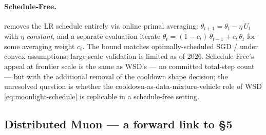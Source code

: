 \paragraph{Schedule-Free.}
\citep[Defazio et
al.\ 2024]{muon-moonlight2025} removes the LR
schedule entirely via online primal averaging:
$\theta_{t+1} = \theta_t - \eta\, U_t$ with $\eta$ \emph{constant},
and a separate evaluation iterate
$\bar{\theta}_t = (1 - c_t)\,\bar{\theta}_{t-1} + c_t\,\theta_t$ for
some averaging weight $c_t$. The bound matches optimally-scheduled
SGD /  under convex assumptions; large-scale  validation is
limited as of 2026. Schedule-Free's appeal at frontier scale is the
same as WSD's --- no committed total-step count --- but with the
additional removal of the cooldown shape decision; the unresolved
question is whether the cooldown-as-data-mixture-vehicle role of WSD
\eqref{eq:moonlight-schedule} is replicable in a schedule-free
setting.

\subsection{Distributed Muon --- a forward link to \S 5}
\label{sec:opt-distributed-muon}

